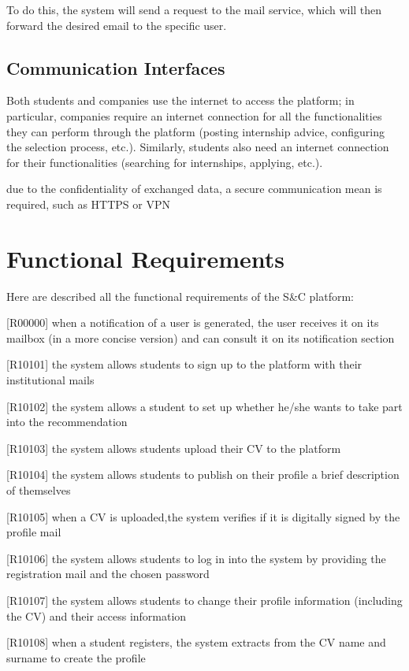 				To do this, the system will send a request to the mail service, which will then forward the desired email to the specific user.
	
	
		\subsection{Communication Interfaces}
			
			Both students and companies use the internet to access the platform; in particular, companies require an internet connection for all the functionalities they can perform through the platform (posting internship advice, configuring the selection process, etc.). Similarly, students also need an internet connection for their functionalities (searching for internships, applying, etc.).
			
			due to the confidentiality of exchanged data, a secure communication mean is required, such as HTTPS or VPN
	\section{Functional Requirements}
	
		Here are described all the functional requirements of the S\&C platform:
		
		
		[R00000] when a notification of a user is generated, the user receives it on its mailbox (in a more concise version) and can consult it on its notification section
		
		[R10101] the system allows students to sign up to the platform with their institutional mails
		
		[R10102] the system allows a student to set up whether he/she wants to take part into the recommendation
		
		[R10103] the system allows students upload their CV to the platform
		
		[R10104] the system allows students to publish on their profile a brief description of themselves
		
		[R10105] when a CV is uploaded,the system verifies if it is digitally signed by the profile mail
		
		[R10106] the system allows students to log in into the system by providing the registration mail and the chosen	password
		
		[R10107] the system allows students to change their profile information (including the CV) and their access information
		
		[R10108] when a student registers, the system extracts from the CV name and surname to create the profile
		
